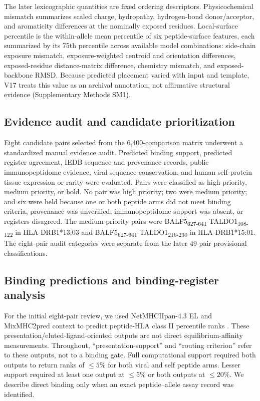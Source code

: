 \documentclass[11pt]{article}
\newcommand{\pep}[2]{#1\textsubscript{#2}}
\begin{document}
The later lexicographic quantities are fixed ordering descriptors. Physicochemical mismatch summarizes scaled charge, hydropathy, hydrogen-bond donor/acceptor, and aromaticity differences at the nominally exposed residues. Local-surface percentile is the within-allele mean percentile of six peptide-surface features, each summarized by its 75th percentile across available model combinations: side-chain exposure mismatch, exposure-weighted centroid and orientation differences, exposed-residue distance-matrix difference, chemistry mismatch, and exposed-backbone RMSD. Because predicted placement varied with input and template, V17 treats this value as an archival annotation, not affirmative structural evidence (Supplementary Methods SM1).

\subsection{Evidence audit and candidate prioritization}
Eight candidate pairs selected from the 6,400-comparison matrix underwent a standardized manual evidence audit. Predicted binding support, predicted register agreement, IEDB sequence and provenance records, public immunopeptidome evidence, viral sequence conservation, and human self-protein tissue expression or rarity were evaluated. Pairs were classified as high priority, medium priority, or hold. No pair was high priority; two were medium priority; and six were held because one or both peptide arms did not meet binding criteria, provenance was unverified, immunopeptidome support was absent, or registers disagreed. The medium-priority pairs were \pep{BALF5}{627-641}-\pep{TALDO1}{108-122} in HLA-DRB1*13:03 and \pep{BALF5}{627-641}-\pep{TALDO1}{216-230} in HLA-DRB1*15:01. The eight-pair audit categories were separate from the later 49-pair provisional classifications.


\subsection{Binding predictions and binding-register analysis}
For the initial eight-pair review, we used NetMHCIIpan-4.3 EL and MixMHC2pred context to predict peptide-HLA class II percentile ranks \cite{netmhc,mix2019,mix2023}. These presentation/eluted-ligand-oriented outputs are not direct equilibrium-affinity measurements. Throughout, ``presentation-support'' and ``routing criterion'' refer to these outputs, not to a binding gate. Full computational support required both outputs to return ranks of $\leq5\%$ for both viral and self peptide arms. Lesser support required at least one output at $\leq5\%$ or both outputs at $\leq20\%$. We describe direct binding only when an exact peptide--allele assay record was identified.
\end{document}
